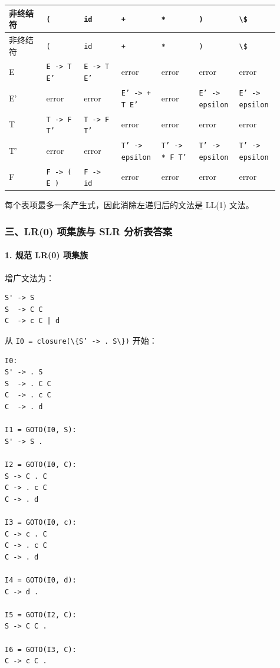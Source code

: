 \documentclass[UTF8]{ctexart}
\begin{document}
\begin{longtable}{|p{0.13\linewidth}|p{0.13\linewidth}|p{0.13\linewidth}|p{0.13\linewidth}|p{0.13\linewidth}|p{0.13\linewidth}|p{0.13\linewidth}|}
\hline
非终结符 & \texttt{(} & \texttt{id} & \texttt{+} & \texttt{*} & \texttt{)} & \texttt{\textbackslash{}\$} \\
\hline
\endfirsthead
非终结符 & \texttt{(} & \texttt{id} & \texttt{+} & \texttt{*} & \texttt{)} & \texttt{\textbackslash{}\$} \\
\hline
\endhead
E & \texttt{E -> T E'} & \texttt{E -> T E'} & error & error & error & error \\
\hline
E' & error & error & \texttt{E' -> + T E'} & error & \texttt{E' -> epsilon} & \texttt{E' -> epsilon} \\
\hline
T & \texttt{T -> F T'} & \texttt{T -> F T'} & error & error & error & error \\
\hline
T' & error & error & \texttt{T' -> epsilon} & \texttt{T' -> * F T'} & \texttt{T' -> epsilon} & \texttt{T' -> epsilon} \\
\hline
F & \texttt{F -> ( E )} & \texttt{F -> id} & error & error & error & error \\
\hline
\end{longtable}

每个表项最多一条产生式，因此消除左递归后的文法是 LL(1) 文法。

\subsubsection*{三、LR(0) 项集族与 SLR 分析表答案}

\paragraph*{1. 规范 LR(0) 项集族}

增广文法为：

\begin{Verbatim}[fontsize=\small,breaklines=true]
S' -> S
S  -> C C
C  -> c C | d
\end{Verbatim}

从 \texttt{I0 = closure(\textbackslash{}\{S' -> . S\textbackslash{}\})} 开始：

\begin{Verbatim}[fontsize=\small,breaklines=true]
I0:
S' -> . S
S  -> . C C
C  -> . c C
C  -> . d

I1 = GOTO(I0, S):
S' -> S .

I2 = GOTO(I0, C):
S -> C . C
C -> . c C
C -> . d

I3 = GOTO(I0, c):
C -> c . C
C -> . c C
C -> . d

I4 = GOTO(I0, d):
C -> d .

I5 = GOTO(I2, C):
S -> C C .

I6 = GOTO(I3, C):
C -> c C .
\end{Verbatim}
\end{document}
